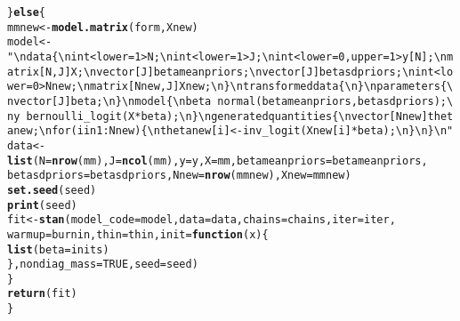 \documentclass{article}\usepackage[]{graphicx}\usepackage[]{color}
\makeatletter
\newcommand{\hlnum}[1]{\textcolor[rgb]{0.686,0.059,0.569}{#1}}%
\newcommand{\hlstr}[1]{\textcolor[rgb]{0.192,0.494,0.8}{#1}}%
\newcommand{\hlstd}[1]{\textcolor[rgb]{0.345,0.345,0.345}{#1}}%
\newcommand{\hlkwa}[1]{\textcolor[rgb]{0.161,0.373,0.58}{\textbf{#1}}}%
\newcommand{\hlkwb}[1]{\textcolor[rgb]{0.69,0.353,0.396}{#1}}%
\newcommand{\hlkwc}[1]{\textcolor[rgb]{0.333,0.667,0.333}{#1}}%
\newcommand{\hlkwd}[1]{\textcolor[rgb]{0.737,0.353,0.396}{\textbf{#1}}}%
\newenvironment{kframe}{%
 \def\at@end@of@kframe{}%
 \ifinner\ifhmode%
  \def\at@end@of@kframe{\end{minipage}}%
  \begin{minipage}{\columnwidth}%
 \fi\fi%
 \def\FrameCommand##1{\hskip\@totalleftmargin \hskip-\fboxsep
 \colorbox{shadecolor}{##1}\hskip-\fboxsep
     \hskip-\linewidth \hskip-\@totalleftmargin \hskip\columnwidth}%
 \MakeFramed {\advance\hsize-\width
   \@totalleftmargin\z@ \linewidth\hsize
   \@setminipage}}%
 {\par\unskip\endMakeFramed%
 \at@end@of@kframe}
\newenvironment{knitrout}{}{} %
\makeatother
\begin{document}
\begin{knitrout}
\begin{kframe}
\begin{alltt}
    \hlstd{\}} \hlkwa{else} \hlstd{\{}
        \hlstd{mmnew} \hlkwb{<-} \hlkwd{model.matrix}\hlstd{(form, Xnew)}
        \hlstd{model} \hlkwb{<-} \hlstr{"\textbackslash{}n  data \{\textbackslash{}n    int<lower=1>               N;\textbackslash{}n    int<lower=1>               J;\textbackslash{}n    int<lower=0, upper=1>   y[N];\textbackslash{}n    matrix[N,J]                X;\textbackslash{}n    vector[J]     betameanpriors;\textbackslash{}n    vector[J]       betasdpriors;\textbackslash{}n    int<lower=0>            Nnew;\textbackslash{}n    matrix[Nnew,J]          Xnew;\textbackslash{}n  \}\textbackslash{}n  transformed data \{\textbackslash{}n  \}\textbackslash{}n  parameters \{\textbackslash{}n    vector[J] beta;\textbackslash{}n  \}\textbackslash{}n  model \{\textbackslash{}n    beta ~ normal(betameanpriors,betasdpriors);\textbackslash{}n    y ~ bernoulli_logit( X*beta );\textbackslash{}n  \}\textbackslash{}n  generated quantities \{\textbackslash{}n    vector[Nnew] thetanew;\textbackslash{}n    for( i in 1:Nnew ) \{\textbackslash{}n      thetanew[i] <- inv_logit( Xnew[i] * beta );\textbackslash{}n    \}\textbackslash{}n  \}\textbackslash{}n  "}
        \hlstd{data} \hlkwb{<-} \hlkwd{list}\hlstd{(}\hlkwc{N} \hlstd{=} \hlkwd{nrow}\hlstd{(mm),} \hlkwc{J} \hlstd{=} \hlkwd{ncol}\hlstd{(mm),} \hlkwc{y} \hlstd{= y,} \hlkwc{X} \hlstd{= mm,} \hlkwc{betameanpriors} \hlstd{= betameanpriors,}
            \hlkwc{betasdpriors} \hlstd{= betasdpriors,} \hlkwc{Nnew} \hlstd{=} \hlkwd{nrow}\hlstd{(mmnew),} \hlkwc{Xnew} \hlstd{= mmnew)}
        \hlkwd{set.seed}\hlstd{(seed)}
        \hlkwd{print}\hlstd{(seed)}
        \hlstd{fit} \hlkwb{<-} \hlkwd{stan}\hlstd{(}\hlkwc{model_code} \hlstd{= model,} \hlkwc{data} \hlstd{= data,} \hlkwc{chains} \hlstd{= chains,} \hlkwc{iter} \hlstd{= iter,}
            \hlkwc{warmup} \hlstd{= burnin,} \hlkwc{thin} \hlstd{= thin,} \hlkwc{init} \hlstd{=} \hlkwa{function}\hlstd{(}\hlkwc{x}\hlstd{) \{}
                \hlkwd{list}\hlstd{(}\hlkwc{beta} \hlstd{= inits)}
            \hlstd{\},} \hlkwc{nondiag_mass} \hlstd{=} \hlnum{TRUE}\hlstd{,} \hlkwc{seed} \hlstd{= seed)}
    \hlstd{\}}
    \hlkwd{return}\hlstd{(fit)}
\hlstd{\}}
\end{alltt}
\end{kframe}
\end{knitrout}
\end{document}
